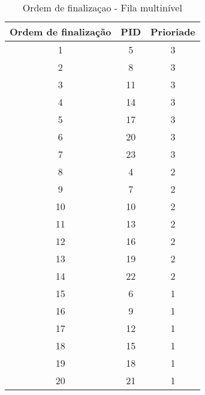 \documentclass{article}
\begin{document}
\begin{table}[H]
      \centering
      \begin{tabular}{|c|c|c|}
            \hline
            \textbf{Ordem de finalização} & \textbf{PID} & \textbf{Prioriade}
            \\
            \hline
            1                             & 5            & 3
            \\
            2                             & 8            & 3
            \\
            3                             & 11           & 3
            \\
            4                             & 14           & 3
            \\
            5                             & 17           & 3
            \\
            6                             & 20           & 3
            \\
            7                             & 23           & 3
            \\
            8                             & 4            & 2
            \\
            9                             & 7            & 2
            \\
            10                            & 10           & 2
            \\
            11                            & 13           & 2
            \\
            12                            & 16           & 2
            \\
            13                            & 19           & 2
            \\
            14                            & 22           & 2
            \\
            15                            & 6            & 1
            \\
            16                            & 9            & 1
            \\
            17                            & 12           & 1
            \\
            18                            & 15           & 1
            \\
            19                            & 18           & 1
            \\
            20                            & 21           & 1
            \\
            \hline
      \end{tabular}
      \caption{Ordem de finalizaçao - Fila multinível}
      \label{tab:indexedtable}
\end{table}
\end{document}
